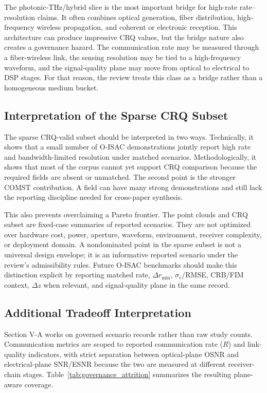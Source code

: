 \documentclass[letterpaper,journal]{IEEEtran}
\begin{document}
The photonic-THz/hybrid slice is the most important bridge for high-rate rate--resolution claims. It often combines optical generation, fiber distribution, high-frequency wireless propagation, and coherent or electronic reception. This architecture can produce impressive CRQ values, but the bridge nature also creates a governance hazard. The communication rate may be measured through a fiber-wireless link, the sensing resolution may be tied to a high-frequency waveform, and the signal-quality plane may move from optical to electrical to DSP stages. For that reason, the review treats this class as a bridge rather than a homogeneous medium bucket.

\subsection{Interpretation of the Sparse CRQ Subset}

The sparse CRQ-valid subset should be interpreted in two ways. Technically, it shows that a small number of O-ISAC demonstrations jointly report high rate and bandwidth-limited resolution under matched scenarios. Methodologically, it shows that most of the corpus cannot yet support CRQ comparison because the required fields are absent or unmatched. The second point is the stronger COMST contribution. A field can have many strong demonstrations and still lack the reporting discipline needed for cross-paper synthesis.

This also prevents overclaiming a Pareto frontier. The point clouds and CRQ subset are fixed-case summaries of reported scenarios. They are not optimized over hardware cost, power, aperture, waveform, environment, receiver complexity, or deployment domain. A nondominated point in the sparse subset is not a universal design envelope; it is an informative reported scenario under the review's admissibility rules. Future O-ISAC benchmarks should make this distinction explicit by reporting matched rate, \(\Delta r_{\min}\), \(\sigma_r\)/RMSE, CRB/FIM context, \(\Delta z\) when relevant, and signal-quality plane in the same record.

\subsection{Additional Tradeoff Interpretation}

Section V-A works on governed scenario records rather than raw study counts. Communication metrics are scoped to reported communication rate ($R$) and link-quality indicators, with strict separation between optical-plane OSNR and electrical-plane SNR/ESNR because the two are measured at different receiver-chain stages. Table~\ref{tab:governance_attrition} summarizes the resulting plane-aware coverage.
\end{document}
